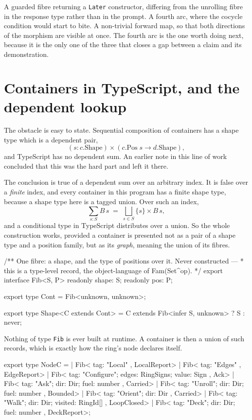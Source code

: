 \documentclass[11pt,a4paper]{article}
\begin{document}
A guarded fibre returning a \verb|Later| constructor, differing from the unrolling
fibre in the response type rather than in the prompt. A fourth arc, where the cocycle
condition would start to bite. A non-trivial forward map, so that both directions of
the morphism are visible at once. The fourth arc is the one worth doing next, because
it is the only one of the three that closes a gap between a claim and its
demonstration.

\appendix

\section{Containers in TypeScript, and the dependent lookup}

The obstacle is easy to state. Sequential composition of containers has a shape type
which is a dependent pair,
\[
  (s : c.\mathrm{Shape}) \times (c.\mathrm{Pos}\; s \to d.\mathrm{Shape}),
\]
and TypeScript has no dependent sum. An earlier note in this line of work concluded
that this was the hard part and left it there.

The conclusion is true of a dependent sum over an arbitrary index. It is false over a
\emph{finite} index, and every container in this program has a finite shape type,
because a shape type here is a tagged union. Over such an index,
\[
  \sum_{s : S} B\, s \;=\; \bigsqcup_{s \in S} \{s\} \times B\, s,
\]
and a conditional type in TypeScript distributes over a union. So the whole
construction works, provided a container is presented not as a pair of a shape type
and a position family, but as its \emph{graph}, meaning the union of its fibres.

\begin{code}
/** One fibre: a shape, and the type of positions over it. Never constructed —
 *  this is a type-level record, the object-language of Fam(Set^op). */
export interface Fib<S, P> {
  readonly shape: S;
  readonly pos: P;
}

export type Cont = Fib<unknown, unknown>;

export type Shape<C extends Cont> = C extends Fib<infer S, unknown> ? S : never;
\end{code}

Nothing of type \verb|Fib| is ever built at runtime. A container is then a union of
such records, which is exactly how the ring's node declares itself.

\begin{code}
export type NodeC =
  | Fib<{ tag: "Local" }, LocalReport>
  | Fib<{ tag: "Edges" }, EdgeReport>
  | Fib<{ tag: "Configure"; edges: RingSigns; value: Sign }, Ack>
  | Fib<{ tag: "Ask"; dir: Dir; fuel: number }, Carried>
  | Fib<{ tag: "Unroll"; dir: Dir; fuel: number }, Bounded>
  | Fib<{ tag: "Orient"; dir: Dir }, Carried>
  | Fib<{ tag: "Walk"; dir: Dir; visited: RingId[] }, LoopClosed>
  | Fib<{ tag: "Deck"; dir: Dir; fuel: number }, DeckReport>;
\end{code}
\end{document}
